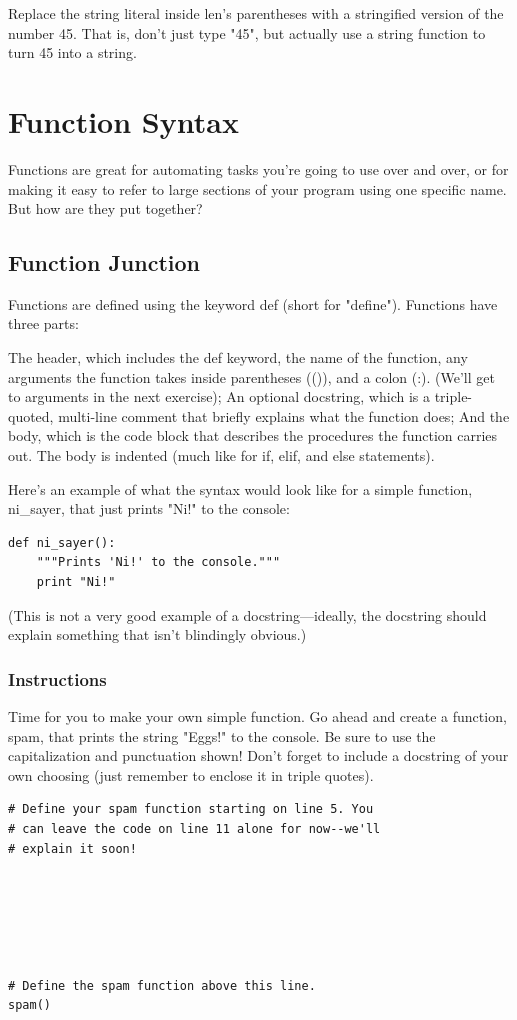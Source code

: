 \documentclass[12pt,a4paper,final,twoside,onecolumn,titlepage]{book}
\begin{document}
Replace the string literal inside len's parentheses with a stringified version of the number 45. That is, don't just type "45", but actually use a string function to turn 45 into a string.

\section{Function Syntax}
Functions are great for automating tasks you're going to use over and over, or for making it easy to refer to large sections of your program using one specific name. But how are they put together?

\subsection{Function Junction}

Functions are defined using the keyword def (short for "define"). Functions have three parts:

    The header, which includes the def keyword, the name of the function, any arguments the function takes inside parentheses (()), and a colon (:). (We'll get to arguments in the next exercise);
    An optional docstring, which is a triple-quoted, multi-line comment that briefly explains what the function does;
    And the body, which is the code block that describes the procedures the function carries out. The body is indented (much like for if, elif, and else statements).

Here's an example of what the syntax would look like for a simple function, ni\_sayer, that just prints "Ni!" to the console:
\begin{lstlisting}
def ni_sayer():
    """Prints 'Ni!' to the console."""
    print "Ni!"
\end{lstlisting}

(This is not a very good example of a docstring—ideally, the docstring should explain something that isn't blindingly obvious.)
\subsubsection{Instructions}

Time for you to make your own simple function. Go ahead and create a function, spam, that prints the string "Eggs!" to the console. Be sure to use the capitalization and punctuation shown! Don't forget to include a docstring of your own choosing (just remember to enclose it in triple quotes).

\begin{lstlisting}
# Define your spam function starting on line 5. You
# can leave the code on line 11 alone for now--we'll
# explain it soon!






# Define the spam function above this line.
spam()
\end{lstlisting}
\end{document}
